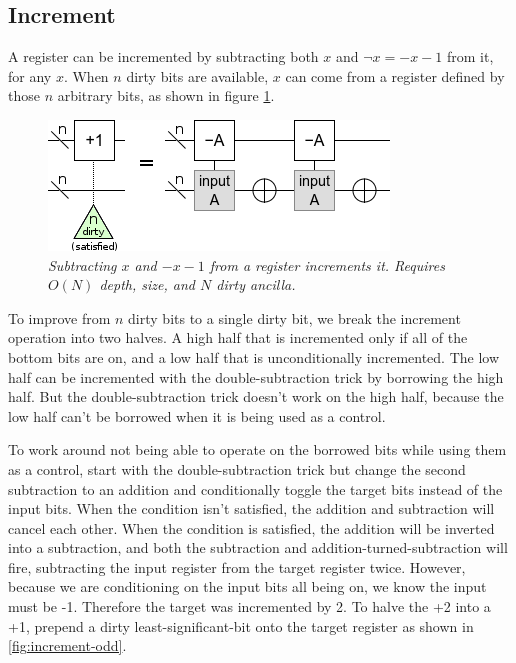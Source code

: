 \documentclass[twocolumn]{article}
\begin{document}
\subsection{Increment}

A register can be incremented by subtracting both $x$ and $\neg x = -x-1$ from it, for any $x$.
When $n$ dirty bits are available, $x$ can come from a register defined by those $n$ arbitrary bits, as shown in figure \ref{fig:increment-many-dirty}.

\begin{figure}
  \centering
  \includegraphics[width=\linewidth]{assets/increment-many-dirty.png}
  \caption{\em Subtracting $x$ and $-x-1$ from a register increments it. Requires $O(N)$ depth, size, and $N$ dirty ancilla.}
  \label{fig:increment-many-dirty}
\end{figure}

To improve from $n$ dirty bits to a single dirty bit, we break the increment operation into two halves.
A high half that is incremented only if all of the bottom bits are on, and a low half that is unconditionally incremented.
The low half can be incremented with the double-subtraction trick by borrowing the high half.
But the double-subtraction trick doesn't work on the high half, because the low half can't be borrowed when it is being used as a control.

To work around not being able to operate on the borrowed bits while using them as a control, start with the double-subtraction trick but change the second subtraction to an addition and conditionally toggle the target bits instead of the input bits.
When the condition isn't satisfied, the addition and subtraction will cancel each other.
When the condition is satisfied, the addition will be inverted into a subtraction, and both the subtraction and addition-turned-subtraction will fire, subtracting the input register from the target register twice.
However, because we are conditioning on the input bits all being on, we know the input must be -1.
Therefore the target was incremented by 2.
To halve the +2 into a +1, prepend a dirty least-significant-bit onto the target register as shown in \ref{fig:increment-odd}.
\end{document}

